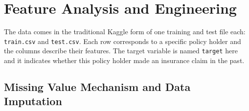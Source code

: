 \documentclass{standalone}
\begin{document}
\section{Feature Analysis and Engineering}

The data comes in the traditional Kaggle form of one training and test file
each: \lstinline{train.csv} and \lstinline{test.csv}. Each row corresponds to a
specific policy holder and the columns describe their features. The target
variable is named \lstinline{target} here and it indicates whether this policy
holder made an insurance claim in the past.


\subsection{Missing Value Mechanism and Data Imputation}
\end{document}
